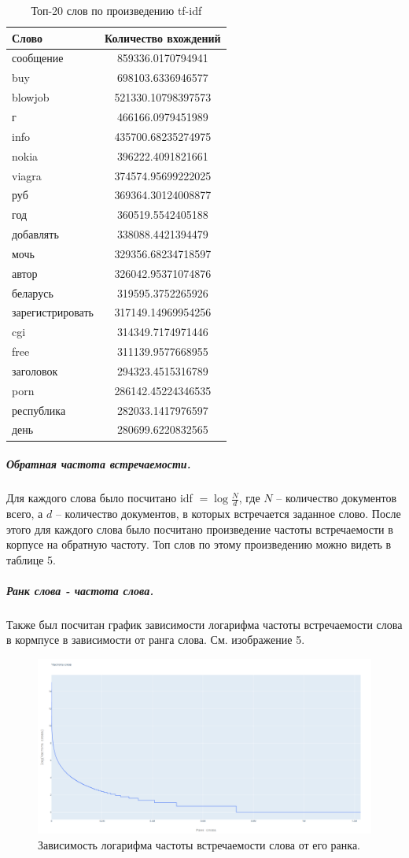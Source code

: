 \begin{table}
	\begin{center}
		\begin{tabular}{|l|c|}
			\hline
			Слово & Количество вхождений\\
			\hline
			сообщение &859336.0170794941\\
			buy &698103.6336946577\\
			blowjob &521330.10798397573\\
			г &466166.0979451989\\
			info &435700.68235274975\\
			nokia &396222.4091821661\\
			viagra &374574.95699222025\\
			руб &369364.30124008877\\
			год &360519.5542405188\\
			добавлять &338088.4421394479\\
			мочь &329356.68234718597\\
			автор &326042.95371074876\\
			беларусь &319595.3752265926\\
			зарегистрировать &317149.14969954256\\
			cgi &314349.7174971446\\
			free &311139.9577668955\\
			заголовок &294323.4515316789\\
			porn &286142.45224346535\\
			республика &282033.1417976597\\
			день &280699.6220832565\\
			\hline
		\end{tabular}
	\end{center}
	\caption{Топ-20 слов по произведению tf-idf}
\end{table}

\subparagraph{Обратная частота встречаемости.}
	Для каждого слова было посчитано idf $ = \log \frac{N}{d}$, где $N$ -- количество документов всего, а $d$ -- количество документов, в которых встречается заданное слово. После этого для каждого слова было посчитано произведение частоты встречаемости в корпусе на обратную частоту. Топ слов по этому произведению можно видеть в таблице 5. 

\subparagraph{Ранк слова - частота слова.}

Также был посчитан график зависимости логарифма частоты встречаемости слова в кормпусе в зависимости от ранга слова. См. изображение 5. 


\begin{figure}
	\includegraphics[width=.5\textwidth]{rank_to_frequency.png}
	\caption{Зависимость логарифма частоты встречаемости слова от его ранка.}
\end{figure}
